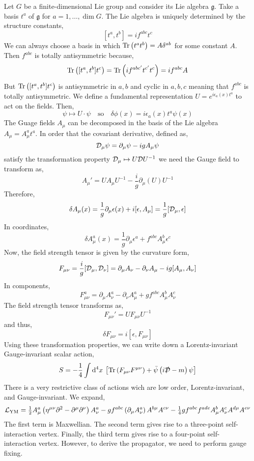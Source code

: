 \documentclass[12pt]{extarticle}
\begin{document}
Let $G$ be a finite-dimensional Lie group and consider its Lie algebra $\mathfrak{g}$. Take a basis $t^a$ of $\mathfrak{g}$ for $a = 1, \dots, \dim{G}$. The Lie algebra is uniquely determined by the structure constants,
\[ [t^a, t^b] = i f^{abc} t^c \]
We can always choose a basis in which $\mathrm{Tr}\left( t^a t^b \right) = A \delta^{ab}$ for some constant $A$. Then $f^{abc}$ is totally antisymmetric because,
\[ \mathrm{Tr}\left( [t^a, t^b] t^c \right) = \mathrm{Tr}\left( i f^{abc'} t^{c'} t^c \right) = i f^{abc} A \]
But $\mathrm{Tr}\left( [t^a, t^b] t^c \right)$ is antisymmetric in $a,b$ and cyclic in $a,b,c$ meaning that $f^{abc}$ is totally antisymmetric. We define a fundamental representation $U = e^{i \epsilon_a(x) t^a}$ to act on the fields. Then,
\[ \psi \mapsto U \cdot \psi \quad \text{so} \quad \delta \phi(x) = i \epsilon_a(x) t^a \psi(x) \]
The Guage fields $A_\mu$ can be decomposed in the basis of the Lie algebra $A_\mu = A_\mu^a t^a$. In order that the covariant derivative, defined as,
\[ \mathcal{D}_\mu \psi = \partial_\mu \psi - i g A_\mu \psi \]
satisfy the transformation property $\mathcal{D}_\mu \mapsto U \mathcal{D} U^{-1}$ we need the Gauge field to transform as,
\[ A_\mu' = U A_\mu U^{-1} - \frac{i}{g} \partial_\mu (U) U^{-1} \]
Therefore,
\[ \delta A_\mu(x) = \frac{1}{g} \partial_\mu \epsilon(x) + i [ \epsilon, A_\mu] = \frac{1}{g} [ \mathcal{D}_\mu, \epsilon ] \]
In coordinates,
\[ \delta A^a_\mu(x) = \frac{1}{g} \partial_\mu \epsilon^a + f^{abc} A_\mu^b \epsilon^c \]
Now, the field strength tensor is given by the curvature form,
\[ F_{\mu\nu} = \frac{i}{g} [ \mathcal{D}_\mu, \mathcal{D}_\nu ] = \partial_\mu A_\nu - \partial_\nu A_\mu - i g [ A_\mu, A_\nu] \]
In components,
\[ F^a_{\mu \nu} = \partial_\mu A^a_\nu - \partial_\nu A^a_\mu + g f^{abc} A_\mu^b A_\nu^c \]
The field strength tensor transforms as,
\[ F_{\mu \nu}' = U F_{\mu \nu} U^{-1} \]
and thus,
\[ 
\delta F_{\mu \nu} = i [ \epsilon, F_{\mu \nu} ] \]
Using these transformation properties, we can write down a Lorentz-invariant Gauge-invariant scalar action,
\[ S = - \frac{1}{4} \int \mathrm{d}^{4} x \: \left[ \mathrm{Tr}\left( F_{\mu \nu} F^{\mu \nu} \right) + \bar{\psi} \left( i \slashed{\mathcal{D}} - m \right) \psi \right] \]
There is a very restrictive class of actions wich are low order, Lorentz-invariant, and Gauge-invariant.
We expand,
\[ \mathcal{L}_{\mathrm{YM}} = \tfrac{1}{2} A^a_\mu \left( \eta^{\mu \nu} \partial^2 - \partial^\mu \partial^\nu \right) A^a_\nu - g f^{abc} \left( \partial_\mu A^a_\nu \right) A^{b \mu} A^{c \nu} - \tfrac{1}{4} g f^{abc} f^{ade} A^b_\mu A^c_\nu A^{d \mu} A^{e \nu} \]
The first term is Maxwellian. The second term gives rise to a three-point self-interaction vertex. Finally, the third term gives rise to a four-point self-interaction vertex. However, to derive the propagator, we need to perform gauge fixing. 
\end{document}
